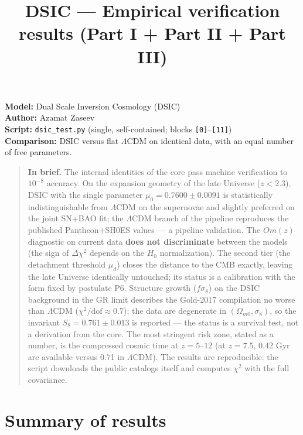 \documentclass[a4paper,10pt]{article}
\begin{document}
\title{DSIC --- Empirical verification results (Part I + Part II + Part III)}
\date{}
\maketitle

\noindent\textbf{Model:} Dual Scale Inversion Cosmology (DSIC)\\
\textbf{Author:} Azamat Zaseev\\
\textbf{Script:} \texttt{dsic\_test.py} (single, self-contained; blocks \texttt{[0]}--\texttt{[11]})\\
\textbf{Comparison:} DSIC versus flat $\Lambda$CDM on identical data, with an equal number of free parameters.

\begin{quote}
\textbf{In brief.} The internal identities of the core pass machine verification to $10^{-8}$ accuracy. On the expansion geometry of the late Universe ($z < 2.3$), DSIC with the single parameter $\mu_0 = 0.7600 \pm 0.0091$ is statistically indistinguishable from $\Lambda$CDM on the supernovae and slightly preferred on the joint SN+BAO fit; the $\Lambda$CDM branch of the pipeline reproduces the published Pantheon+SH0ES values --- a pipeline validation. The $Om(z)$ diagnostic on current data \textbf{does not discriminate} between the models (the sign of $\Delta\chi^2$ depends on the $H_0$ normalization). The second tier (the detachment threshold $\mu_d$) closes the distance to the CMB exactly, leaving the late Universe identically untouched; its status is a calibration with the form fixed by postulate P6. Structure growth ($f\sigma_8$) on the DSIC background in the GR limit describes the Gold-2017 compilation no worse than $\Lambda$CDM ($\chi^2/\text{dof} \approx 0.7$); the data are degenerate in $(\Omega_{m0}, \sigma_8)$, so the invariant $S_8 = 0.761 \pm 0.013$ is reported --- the status is a survival test, not a derivation from the core. The most stringent risk zone, stated as a number, is the compressed cosmic time at $z = 5\text{--}12$ (at $z = 7.5$, 0.42 Gyr are available versus 0.71 in $\Lambda$CDM). The results are reproducible: the script downloads the public catalogs itself and computes $\chi^2$ with the full covariance.
\end{quote}

\clearpage
\section{Summary of results}
\end{document}
